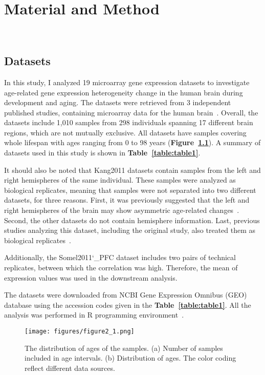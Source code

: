\chapter{Material and Method}~\label{chp:b2}
\section{Datasets}
In this study, I analyzed 19 microarray gene expression datasets to investigate age-related gene expression heterogeneity change in the human brain during development and aging.
The datasets were retrieved from 3 independent published studies, containing microarray data for the human brain~\cite{Colantuoni2011, Kang2011, Somel2011, Somel2010}.
Overall, the datasets include 1,010 samples from 298 individuals spanning 17 different brain regions, which are not mutually exclusive.
All datasets have samples covering whole lifespan with ages ranging from 0 to 98 years (\textbf{Figure~\ref{fig:fig2.1}}).
A summary of datasets used in this study is shown in \textbf{Table~\ref{table:table1}}.

It should also be noted that Kang2011 datasets contain samples from the left and right hemispheres of the same individual.
These samples were analyzed as biological replicates, meaning that samples were not separated into two different datasets, for three reasons.
First, it was previously suggested that the left and right hemispheres of the brain may show asymmetric age-related changes~\cite{Sun2005, Dolcos2002}.
Second, the other datasets do not contain hemisphere information.
Last, previous studies analyzing this dataset, including the original study, also treated them as biological replicates~\cite{Kang2011, Donertas2017}.

Additionally, the Somel2011\char`_PFC dataset includes two pairs of technical replicates, between which the correlation was high. 
Therefore, the mean of expression values was used in the downstream analysis.

The datasets were downloaded from NCBI Gene Expression Omnibus (GEO) database using the accession codes given in the \textbf{Table~\ref{table:table1}}. 
All the analysis was performed in R programming environment~\cite{R2020}.

\begin{figure}[h]
\centering
\texttt{[image: figures/figure2\_1.png]}
\caption{The distribution of ages of the samples. (a) Number of samples included in age intervals. (b) Distribution of ages. The color coding reflect different data sources. }\label{fig:fig2.1}
\end{figure}

